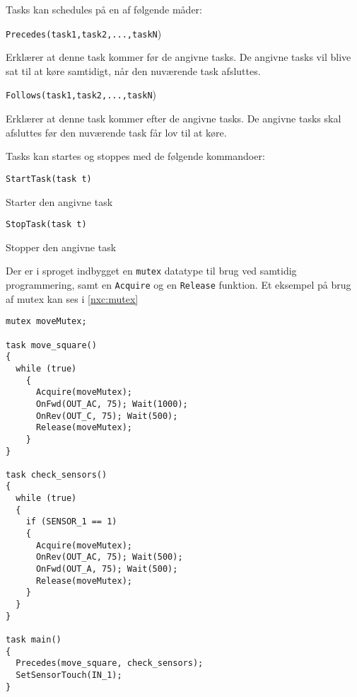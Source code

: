 Tasks kan schedules på en af følgende måder:

\begin{description}
\item{\lstinline[style=c]!Precedes(task1,task2,...,taskN!)}

Erklærer at denne task kommer før de angivne tasks. 
De angivne tasks vil blive sat til at køre samtidigt, når den nuværende task afsluttes.
\item{\lstinline[style=c]!Follows(task1,task2,...,taskN!)}

Erklærer at denne task kommer efter de angivne tasks. 
De angivne tasks skal afsluttes før den nuværende task får lov til at køre.
\end{description}

Tasks kan startes og stoppes med de følgende kommandoer:

\begin{description}
\item{\lstinline[style=c]!StartTask(task t)!}

Starter den angivne task

\item{\lstinline[style=c]!StopTask(task t)!}

Stopper den angivne task
\end{description}

Der er i sproget indbygget en \lstinline[style=c]!mutex! datatype til brug ved samtidig programmering, samt en \lstinline[style=c]!Acquire! og en \lstinline[style=c]!Release! funktion.
Et eksempel på brug af mutex kan ses i \cref{nxc:mutex}

\begin{lstlisting}[style=c,label=nxc:mutex, caption={Eksempel på brug af mutex.}]
mutex moveMutex;

task move_square()
{
  while (true)
    {
      Acquire(moveMutex);
      OnFwd(OUT_AC, 75); Wait(1000);
      OnRev(OUT_C, 75); Wait(500);
      Release(moveMutex);
    }
}

task check_sensors()
{
  while (true)
  {
    if (SENSOR_1 == 1)
    {
      Acquire(moveMutex);
      OnRev(OUT_AC, 75); Wait(500);
      OnFwd(OUT_A, 75); Wait(500);
      Release(moveMutex);
    }
  }
}

task main()
{
  Precedes(move_square, check_sensors);
  SetSensorTouch(IN_1);
}
\end{lstlisting}

